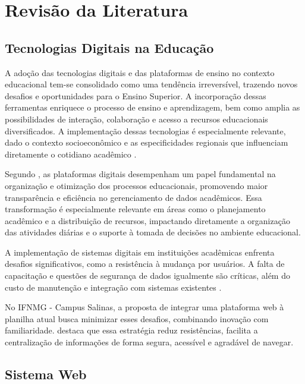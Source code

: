 \chapter{Revisão da Literatura} 
\label{cap3_revisao} 

\section{Tecnologias Digitais na Educação}

A adoção das tecnologias digitais e das plataformas de ensino no contexto educacional tem-se consolidado como uma tendência irreversível, trazendo novos desafios e oportunidades para o Ensino Superior. A incorporação dessas ferramentas enriquece o processo de ensino e aprendizagem, bem como amplia as possibilidades de interação, colaboração e acesso a recursos educacionais diversificados. A implementação dessas tecnologias é especialmente relevante, dado o contexto socioeconômico e as especificidades regionais que influenciam diretamente o cotidiano acadêmico \cite{Ferreira_Lopes_Oliveira_Carvalho_Souza_Santos_Silva_Veloso_2024}.

Segundo , as plataformas digitais desempenham um papel fundamental na organização e otimização dos processos educacionais, promovendo maior transparência e eficiência no gerenciamento de dados acadêmicos. Essa transformação é especialmente relevante em áreas como o planejamento acadêmico e a distribuição de recursos, impactando diretamente a organização das atividades diárias e o suporte à tomada de decisões no ambiente educacional.

A implementação de sistemas digitais em instituições acadêmicas enfrenta desafios significativos, como a resistência à mudança por usuários. A falta de capacitação e questões de segurança de dados igualmente são críticas, além do custo de manutenção e integração com sistemas existentes \cite{senger2022gestao}.

No IFNMG - Campus Salinas, a proposta de integrar uma plataforma web à planilha atual busca minimizar esses desafios, combinando inovação com familiaridade.  destaca que essa estratégia reduz resistências, facilita a centralização de informações de forma segura, acessível e agradável de navegar.

\section{Sistema Web}

